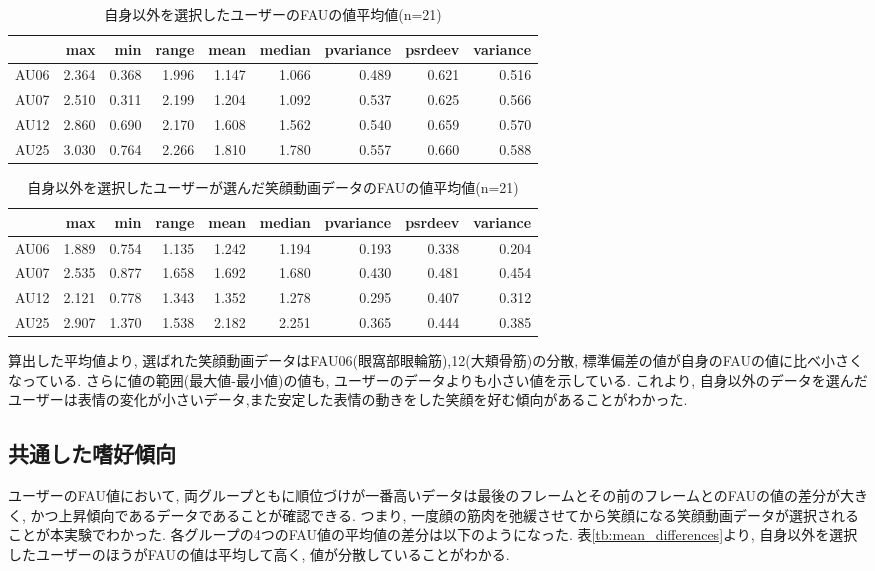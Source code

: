 \begin{table}[htb]
  \caption{自身以外を選択したユーザーのFAUの値平均値(n=21)}
  \label{tb:choiceelse}
  \begin{center}
  \begin{tabular}{|l||r|r|r|r|r|r|r|r|} \hline
    &max	&min	&range	&mean	&median	&pvariance	&psrdeev	&variance \\ \hline \hline
  AU06	&2.364	&0.368	&1.996	&1.147	&1.066	&0.489	&0.621	&0.516 \\ \hline
  AU07	&2.510	&0.311	&2.199	&1.204	&1.092	&0.537	&0.625	&0.566 \\ \hline
  AU12	&2.860	&0.690	&2.170	&1.608	&1.562	&0.540	&0.659	&0.570 \\ \hline
  AU25	&3.030	&0.764	&2.266	&1.810	&1.780	&0.557	&0.660	&0.588 \\ \hline
  \end{tabular}
  \end{center}
\end{table}

\begin{table}[htb]
  \caption{自身以外を選択したユーザーが選んだ笑顔動画データのFAUの値平均値(n=21)}
  \label{tb:elsechoice}
  \begin{center}
  \begin{tabular}{|l||r|r|r|r|r|r|r|r|} \hline
    &max	&min	&range	&mean	&median	&pvariance	&psrdeev	&variance \\ \hline \hline
  AU06	&1.889	&0.754	&1.135	&1.242	&1.194	&0.193	&0.338	&0.204 \\ \hline
  AU07	&2.535	&0.877	&1.658	&1.692	&1.680	&0.430	&0.481	&0.454 \\ \hline
  AU12	&2.121	&0.778	&1.343	&1.352	&1.278	&0.295	&0.407	&0.312 \\ \hline
  AU25	&2.907	&1.370	&1.538	&2.182	&2.251	&0.365	&0.444	&0.385 \\ \hline
  \end{tabular}
  \end{center}
\end{table}

算出した平均値より, 選ばれた笑顔動画データはFAU06(眼窩部眼輪筋),12(大頬骨筋)の分散, 標準偏差の値が自身のFAUの値に比べ小さくなっている.
さらに値の範囲(最大値-最小値)の値も, ユーザーのデータよりも小さい値を示している.
これより, 自身以外のデータを選んだユーザーは表情の変化が小さいデータ,また安定した表情の動きをした笑顔を好む傾向があることがわかった.

\subsection{共通した嗜好傾向}
ユーザーのFAU値において, 両グループともに順位づけが一番高いデータは最後のフレームとその前のフレームとのFAUの値の差分が大きく,
かつ上昇傾向であるデータであることが確認できる.
つまり, 一度顔の筋肉を弛緩させてから笑顔になる笑顔動画データが選択されることが本実験でわかった.
各グループの4つのFAU値の平均値の差分は以下のようになった.
表\ref{tb:mean_differences}より, 自身以外を選択したユーザーのほうがFAUの値は平均して高く, 値が分散していることがわかる.

